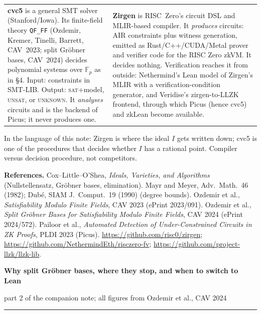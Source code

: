 \documentclass[10pt]{article}
\newcommand{\F}{\mathbb F}\newcommand{\wb}{\overline w}
\newcommand{\sect}[1]{\par\vspace{4pt}{\large\bfseries #1}\par\nobreak\vspace{1pt}}
\begin{document}
\sect{7. cvc5 versus Zirgen: different layers of the stack}
\begin{tabular}{@{}p{}p{}@{}}
\textbf{cvc5} is a general SMT solver (Stanford/Iowa). Its finite-field theory
\texttt{QF\_FF} (Ozdemir, Kremer, Tinelli, Barrett, CAV~2023; split Gr\"obner bases, CAV~2024) decides polynomial systems over
$\F_p$ as in \S4. Input: constraints in SMT-LIB. Output: \textsc{sat}+model, \textsc{unsat}, or \textsc{unknown}. It
\emph{analyses} circuits and is the backend of Picus; it never produces one. &
\textbf{Zirgen} is RISC~Zero's circuit DSL and MLIR-based compiler. It \emph{produces} circuits: AIR constraints plus witness
generation, emitted as Rust/C++/CUDA/Metal prover and verifier code for the RISC Zero zkVM. It decides nothing. Verification
reaches it from outside: Nethermind's Lean model of Zirgen's MLIR with a verification-condition generator, and Veridise's
zirgen-to-LLZK frontend, through which Picus (hence cvc5) and zkLean become available.
\end{tabular}

In the language of this note: Zirgen is where the ideal $I$ gets written down; cvc5 is one of the procedures that decides whether
$I$ has a rational point. Compiler versus decision procedure, not competitors.

{\scriptsize\textbf{References.} Cox--Little--O'Shea, \emph{Ideals, Varieties, and Algorithms} (Nullstellensatz, Gr\"obner bases, elimination).
Mayr and Meyer, Adv.\ Math.\ 46 (1982); Dub\'e, SIAM J.\ Comput.\ 19 (1990) (degree bounds).
Ozdemir et al., \emph{Satisfiability Modulo Finite Fields}, CAV 2023 (ePrint 2023/091). Ozdemir et al., \emph{Split Gr\"obner Bases
for Satisfiability Modulo Finite Fields}, CAV 2024 (ePrint 2024/572). Pailoor et al., \emph{Automated Detection of
Under-Constrained Circuits in ZK Proofs}, PLDI 2023 (Picus). \url{https://github.com/risc0/zirgen};
\url{https://github.com/NethermindEth/risczero-fv}; \url{https://github.com/project-llzk/llzk-lib}.}

\newpage
{\LARGE\bfseries Why split Gr\"obner bases, where they stop, and when to switch to Lean\par}\vspace{-2pt}
{\raggedleft\small part 2 of the companion note; all figures from Ozdemir et al., CAV 2024\par}\vspace{-4pt}
\rule{\textwidth}{0.4pt}
\end{document}
